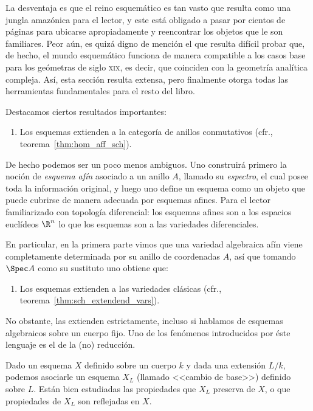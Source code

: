 \documentclass[11pt]{book}
\begin{document}
La desventaja es que el reino esquemático es tan vasto que resulta como una jungla amazónica para el lector, y este está obligado a pasar por cientos de páginas
para ubicarse apropiadamente y reencontrar los objetos que le son familiares.
Peor aún, es quizá digno de mención el que resulta difícil probar que, de hecho, el mundo esquemático funciona de manera compatible a los casos base para los
geómetras de siglo \textsc{xix}, es decir, que coinciden con la geometría analítica compleja.
Así, esta sección resulta extensa, pero finalmente otorga todas las herramientas fundamentales para el resto del libro.

Destacamos ciertos resultados importantes:
\begin{enumerate}
	\item Los esquemas extienden a la categoría de anillos conmutativos (cfr., teorema~\ref{thm:hom_aff_sch}).
\end{enumerate}
De hecho podemos ser un poco menos ambiguos.
Uno construirá primero la noción de \textit{esquema afín} asociado a un anillo $A$, llamado su \textit{espectro}, el cual posee toda la información original,
y luego uno define un esquema como un objeto que puede cubrirse de manera adecuada por esquemas afines.
Para el lector familiarizado con topología diferencial: los esquemas afines son a los espacios euclídeos $\R^n$ lo que los esquemas
son a las variedades diferenciales.

En particular, en la primera parte vimos que una variedad algebraica afín viene completamente determinada por su anillo de coordenadas $A$,
así que tomando $\Spec A$ como su sustituto uno obtiene que:
\begin{enumerate}[resume]
	\item Los esquemas extienden a las variedades clásicas (cfr., teorema~\ref{thm:sch_extendend_vars}).
\end{enumerate}
No obstante, las extienden estrictamente, incluso si hablamos de esquemas algebraicos sobre un cuerpo fijo.
Uno de los fenómenos introducidos por éste lenguaje es el de la (no) reducción.

Dado un esquema $X$ definido sobre un cuerpo $k$ y dada una extensión $L/k$, podemos asociarle un esquema $X_L$ (llamado <<cambio de base>>) definido sobre $L$.
Están bien estudiadas las propiedades que $X_L$ preserva de $X$, o que propiedades de $X_L$ son reflejadas en $X$.
\end{document}
